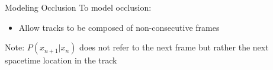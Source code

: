 \documentclass[aspectratio=43]{beamer}
\begin{document}
		\begin{frame}{Modeling Occlusion}
			To model occlusion:
			\begin{itemize}
				\item Allow tracks to be composed of non-consecutive frames
			\end{itemize}
			\color{white}
			{\only<4->{\color{black}}
				Note: $P(x_{n+1}|x_n)$ does not refer to the next frame but rather the next spacetime location in the track
			}
		\end{frame}
		
\end{document}
